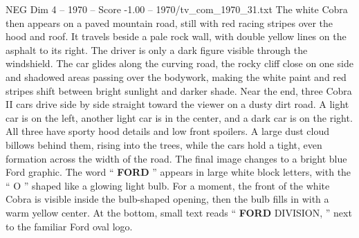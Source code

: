 \begin{textsample}{NEG Dim 4 – 1970 – Score -1.00 – 1970/tv\_com\_1970\_31.txt}
The white Cobra then appears on a paved mountain road, still with red racing stripes over the hood and roof.
It travels beside a pale rock wall, with double yellow lines on the asphalt to its right.
The driver is only a dark figure visible through the windshield.
The car glides along the curving road, the rocky cliff close on one side and shadowed areas passing over the bodywork, making the white paint and red stripes shift between bright sunlight and darker shade.
Near the end, three Cobra II cars drive side by side straight toward the viewer on a dusty dirt road.
A light car is on the left, another light car is in the center, and a dark car is on the right.
All three have sporty hood details and low front spoilers.
A large dust cloud billows behind them, rising into the trees, while the cars hold a tight, even formation across the width of the road.
The final image changes to a bright blue Ford graphic.
The word “ \textbf{FORD} ” appears in large white block letters, with the “ O ” shaped like a glowing light bulb.
For a moment, the front of the white Cobra is visible inside the bulb-shaped opening, then the bulb fills in with a warm yellow center.
At the bottom, small text reads “ \textbf{FORD} DIVISION, ” next to the familiar Ford oval logo.

\end{textsample}
